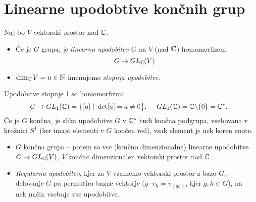 \section{Linearne upodobtive kon\v cnih grup}

\begin{defin}
	Naj bo $V$ vektorski prostor nad $\mathbb{C}$.
	\begin{itemize}
		\item{\v Ce je $G$ grupa, je {\em linearna upodobitev} $G$ na $V$ (nad $\mathbb{C}$) homomorfizem
			\[
				G \to GL_{\mathbb{C}}(V)
			\]}
		\item{$\dim_{\mathbb{C}} V = n \in \mathbb{N}$ imenujemo {\em stopnja upodobitve}.}
	\end{itemize}
\end{defin}

\begin{zgled} Upodobitve stopnje 1 so homomorfizmi
\[
	G \to GL_1(\mathbb{C}) = \big\{[a]\ |\ \det[a] = a \neq 0\big\},\ \quad GL_1(\mathbb{C}) = \mathbb{C}\backslash\{0\} = \mathbb{C}^*.
\]
\ni \v Ce je $G$ kon\v cna, je slika upodobitve $G$ v $\mathbb{C}^*$ tudi kon\v cna podgrupa, vsebovana v kro\v znici $S^1$ (ker imajo
elementi v $G$ kon\v cen red), vsak element je nek koren enote.
\end{zgled}

\begin{itemize}
	\item{$G$ kon\v cna grupa -- potem so vse (kon\v cno dimenzionalne) linearne upodobitve $G \to GL_{\mathbb{C}} (V)$, $V$ kon\v cno
		dimenzionalen vektorski prostor nad $\mathbb{C}$.}
	\item{\emph{Regularna upodobitev}, kjer za $V$ vzamemo vektorski prostor z bazo $G$, delovanje $G$ pa permutira bazne vektorje
		$(g\cdot v_h = v_{(gh)}$, kjer $g,h \in G$), na nek na\v cin vsebuje vse upodobitve.}
\end{itemize}

